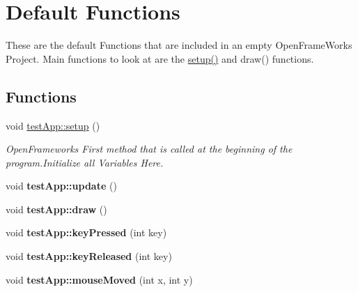 \hypertarget{group___open_frame_works}{\section{Default Functions}
\label{group___open_frame_works}
}


These are the default Functions that are included in an empty Open\-Frame\-Works Project. Main functions to look at are the \hyperlink{group___open_frame_works_gad431db15b6150b965cd52bcba8e16e11}{setup()} and draw() functions.  


\subsection*{Functions}
\begin{DoxyCompactItemize}
\item 
\hypertarget{group___open_frame_works_gad431db15b6150b965cd52bcba8e16e11}{void \hyperlink{group___open_frame_works_gad431db15b6150b965cd52bcba8e16e11}{test\-App\-::setup} ()}\label{group___open_frame_works_gad431db15b6150b965cd52bcba8e16e11}

\begin{DoxyCompactList}\small\item\em Open\-Frameworks First method that is called at the beginning of the program.\-Initialize all Variables Here. \end{DoxyCompactList}\item 
\hypertarget{group___open_frame_works_gafb39d201aec71a295b7609876bf7d0c6}{void {\bfseries test\-App\-::update} ()}\label{group___open_frame_works_gafb39d201aec71a295b7609876bf7d0c6}

\item 
\hypertarget{group___open_frame_works_gaf869cba67b1dab8481f8d0e216d59dcd}{void {\bfseries test\-App\-::draw} ()}\label{group___open_frame_works_gaf869cba67b1dab8481f8d0e216d59dcd}

\item 
\hypertarget{group___open_frame_works_ga904d147c7e532cb92656d5dd4895cd26}{void {\bfseries test\-App\-::key\-Pressed} (int key)}\label{group___open_frame_works_ga904d147c7e532cb92656d5dd4895cd26}

\item 
\hypertarget{group___open_frame_works_ga1116a10088e4932f6d482efe723cd45e}{void {\bfseries test\-App\-::key\-Released} (int key)}\label{group___open_frame_works_ga1116a10088e4932f6d482efe723cd45e}

\item 
\hypertarget{group___open_frame_works_ga33541b19eff9f8285b2487bfc146d58b}{void {\bfseries test\-App\-::mouse\-Moved} (int x, int y)}\label{group___open_frame_works_ga33541b19eff9f8285b2487bfc146d58b}


\end{DoxyCompactItemize}
